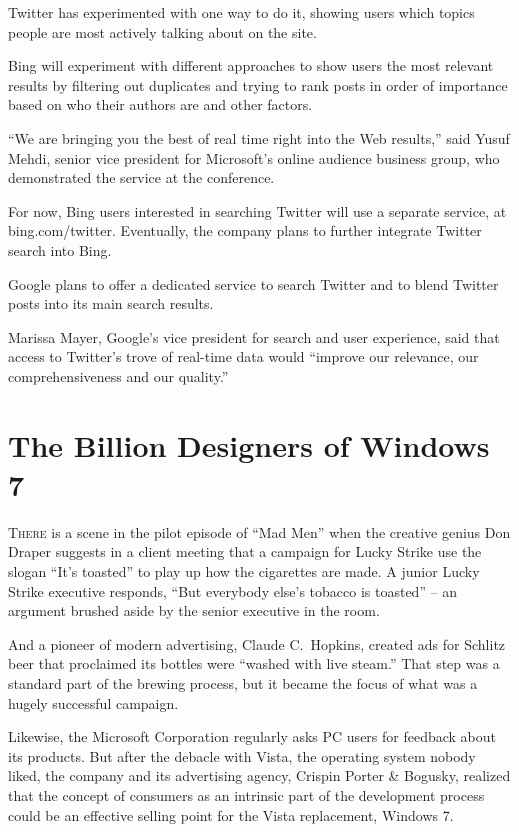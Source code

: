 ﻿\documentclass[12pt]{article}
\begin{document}
Twitter has experimented with one way to do it, showing users which topics people are most actively
talking about on the site.

Bing will experiment with different approaches to show users the most relevant results by filtering
out duplicates and trying to rank posts in order of importance based on who their authors are and
other factors.

``We are bringing you the best of real time right into the Web results,'' said Yusuf Mehdi, senior
vice president for Microsoft's online audience business group, who demonstrated the service at the
conference.

For now, Bing users interested in searching Twitter will use a separate service, at
bing.com/twitter. Eventually, the company plans to further integrate Twitter search into Bing.

Google plans to offer a dedicated service to search Twitter and to blend Twitter posts into its main
search results.

Marissa Mayer, Google's vice president for search and user experience, said that access to Twitter's
trove of real-time data would ``improve our relevance, our comprehensiveness and our quality.''

\section{The Billion Designers of Windows 7}

\lettrine{T}{here} is a scene in the pilot episode of ``Mad Men'' when the
creative genius Don Draper suggests in a client meeting that a campaign for Lucky Strike use the
slogan ``It's toasted'' to play up how the cigarettes are made. A junior Lucky Strike executive
responds, ``But everybody else's tobacco is toasted'' -- an argument brushed aside by the senior
executive in the room.

And a pioneer of modern advertising, Claude C.~Hopkins, created ads for Schlitz beer that proclaimed
its bottles were ``washed with live steam.'' That step was a standard part of the brewing process,
but it became the focus of what was a hugely successful campaign.

Likewise, the Microsoft Corporation regularly asks PC users for feedback about its products. But
after the debacle with Vista, the operating system nobody liked, the company and its advertising
agency, Crispin Porter \& Bogusky, realized that the concept of consumers as an
intrinsic\cite{intrinsic} part of the development process could be an effective selling point for
the Vista replacement, Windows 7.
\end{document}
